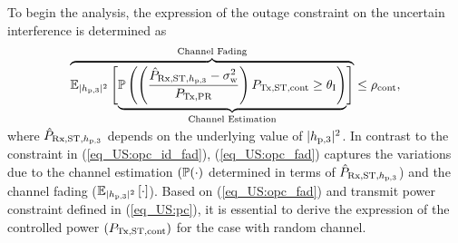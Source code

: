 To begin the analysis, the expression of the outage constraint on the uncertain interference is determined as 
\begin{align}
\smash[b]{\overbrace{{\mathbb E}_{|h_{\text{p,3}}|^2}\left[ \smash[b]{\underbrace{\mathbb P\left( \left( \frac{\hat{P}_{\text{Rx,ST,$h_{\text{p,3}}$}}- \sigma^2_{\text{w}}}{P_{\text{Tx,PR}}}\right) P_{\text{Tx,ST,cont}} \ge \theta_{\text{I}} \right)}_{\text{Channel Estimation}}} \right]}^{\text{Channel Fading}}} \le \rho_{\text{cont}}, \label{eq_US:opc_fad} \\[0.5em] \nonumber 
\end{align}
where $\hat{P}_{\text{Rx,ST,$h_{\text{p,3}}$}}$ depends on the underlying value of $|h_{\text{p,3}}|^2$. In contrast to the constraint in (\ref{eq_US:opc_id_fad}), (\ref{eq_US:opc_fad}) captures the variations due to the channel estimation $(\mathbb P(\cdot)$ determined in terms of $\hat{P}_{\text{Rx,ST,$h_{\text{p,3}}$}}$) and the channel fading (${\mathbb E}_{|h_{\text{p,3}}|^2}\left[ \cdot \right]$). Based on (\ref{eq_US:opc_fad}) and transmit power constraint defined in (\ref{eq_US:pc}), it is essential to derive the expression of the controlled power $(P_{\text{Tx,ST,cont}})$ for the case with random channel.

